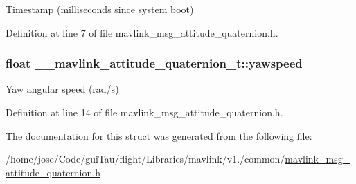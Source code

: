 Timestamp (milliseconds since system boot) 



Definition at line 7 of file mavlink\-\_\-msg\-\_\-attitude\-\_\-quaternion.\-h.

\hypertarget{struct____mavlink__attitude__quaternion__t_a6e76b94100205e6f58df4232c1b4c32e}{
\subsubsection[{yawspeed}]{\setlength{\rightskip}{0pt plus 5cm}float \-\_\-\-\_\-mavlink\-\_\-attitude\-\_\-quaternion\-\_\-t\-::yawspeed}}\label{struct____mavlink__attitude__quaternion__t_a6e76b94100205e6f58df4232c1b4c32e}


Yaw angular speed (rad/s) 



Definition at line 14 of file mavlink\-\_\-msg\-\_\-attitude\-\_\-quaternion.\-h.



The documentation for this struct was generated from the following file\-:\begin{DoxyCompactItemize}
\item 
/home/jose/\-Code/gui\-Tau/flight/\-Libraries/mavlink/v1./common/\hyperlink{mavlink__msg__attitude__quaternion_8h}{mavlink\-\_\-msg\-\_\-attitude\-\_\-quaternion.\-h}\end{DoxyCompactItemize}
